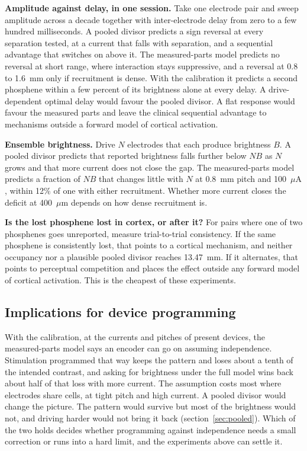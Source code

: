 \documentclass[10pt,twocolumn]{article}
\newcommand{\um}{\ensuremath{\mu\text{m}}}
\newcommand{\uA}{\ensuremath{\mu\text{A}}}
\begin{document}
\textbf{Amplitude against delay, in one session.} Take one electrode pair
and sweep amplitude across a decade together with inter-electrode delay
from zero to a few hundred milliseconds. A pooled divisor predicts a sign
reversal at every separation tested, at a current that falls with
separation, and a sequential advantage that switches on above it. The
measured-parts model predicts no reversal at short range, where interaction
stays suppressive, and a reversal at 0.8 to 1.6~mm only if recruitment is
dense. With the calibration it predicts a second phosphene within a few
percent of its brightness alone at every delay. A drive-dependent optimal
delay would favour the pooled divisor. A flat response would favour the
measured parts and leave the clinical sequential advantage
\citep{armentasalas2022} to mechanisms outside a forward model of cortical
activation.

\textbf{Ensemble brightness.} Drive $N$ electrodes that each produce
brightness $B$. A pooled divisor predicts that reported brightness falls
further below $NB$ as $N$ grows and that more current does not close the
gap. The measured-parts model predicts a fraction of $NB$ that changes
little with $N$ at 0.8~mm pitch and 100~\uA, within 12\% of one with
either recruitment. Whether more current closes the deficit at 400~\um{}
depends on how dense recruitment is.

\textbf{Is the lost phosphene lost in cortex, or after it?} For pairs
where one of two phosphenes goes unreported, measure trial-to-trial
consistency. If the same phosphene is consistently lost, that points to a
cortical mechanism, and neither occupancy nor a plausible pooled divisor
reaches 13.47~mm. If it alternates, that points to perceptual competition
and places the effect outside any forward model of cortical activation.
This is the cheapest of these experiments.

\subsection{Implications for device programming}

With the calibration, at the currents and pitches of present devices,
the measured-parts model says an encoder can go on assuming independence. Stimulation programmed
that way keeps the pattern and loses about a tenth of the intended
contrast, and asking for brightness under the full model wins back about
half of that loss with more current. The assumption costs most where
electrodes share cells, at tight pitch and high current. A pooled divisor
would change the picture. The pattern would survive but most of the
brightness would not, and driving harder would not bring it back
(section~\ref{sec:pooled}). Which of the two holds decides whether
programming against independence needs a small correction or runs into a
hard limit, and the experiments above can settle it.
\end{document}
